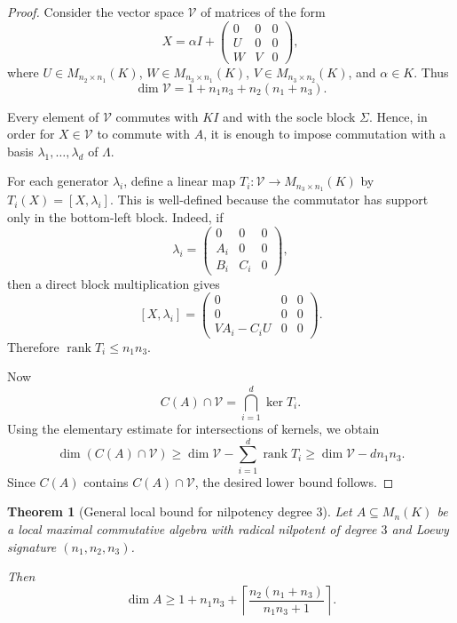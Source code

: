 \documentclass[11pt]{article}
\theoremstyle{remark}
\theoremstyle{plain}
\newtheorem{theorem}{Theorem}
\theoremstyle{definition}
\theoremstyle{myremark}
\begin{document}
\begin{proof}
	Consider the vector space \(\mathcal V\) of matrices of the form
	\[
	X=\alpha I+
	\begin{pmatrix}
		0&0&0\\
		U&0&0\\
		W&V&0
	\end{pmatrix},
	\]
	where \(U\in M_{n_2\times n_1}(K)\), \(W\in M_{n_3\times n_1}(K)\),
	\(V\in M_{n_3\times n_2}(K)\), and \(\alpha\in K\). Thus
	\[
	\dim \mathcal V=1+n_1n_3+n_2(n_1+n_3).
	\]
	
	Every element of \(\mathcal V\) commutes with \(KI\) and with the socle block
	\(\Sigma\). Hence, in order for \(X\in \mathcal V\) to commute with \(A\), it is enough
	to impose commutation with a basis
	\(\lambda_1,\dots,\lambda_d\) of \(\Lambda\).
	
	For each generator \(\lambda_i\), define a linear map
	\(T_i:\mathcal V\to M_{n_3\times n_1}(K)\) by \(T_i(X)=[X,\lambda_i]\). This is
	well-defined because the commutator has support only in the bottom-left block.
	Indeed, if
	\[
	\lambda_i=
	\begin{pmatrix}
		0&0&0\\
		A_i&0&0\\
		B_i&C_i&0
	\end{pmatrix},
	\]
	then a direct block multiplication gives
	\[
	[X,\lambda_i]=
	\begin{pmatrix}
		0&0&0\\
		0&0&0\\
		VA_i-C_iU&0&0
	\end{pmatrix}.
	\]
	Therefore \(\operatorname{rank}T_i\le n_1n_3\).
	
	Now
	\[
	C(A)\cap \mathcal V=\bigcap_{i=1}^d \ker T_i.
	\]
	Using the elementary estimate for intersections of kernels, we obtain
	\[
	\dim(C(A)\cap \mathcal V)
	\ge \dim\mathcal  V-\sum_{i=1}^d \operatorname{rank}T_i
	\ge \dim \mathcal V-dn_1n_3.
	\]
	Since \(C(A)\) contains \(C(A)\cap \mathcal V\), the desired lower bound follows.
\end{proof}\medskip


\begin{theorem}[General local bound for nilpotency degree \(3\)]
	Let \(A\subseteq M_n(K)\) be a local maximal commutative algebra with
	radical nilpotent of degree \(3\) and Loewy signature
	\((n_1,n_2,n_3)\).
	
	Then
	\begin{equation}\label{general3}
		\dim A\ge 1+n_1n_3+	\left\lceil	\frac{n_2(n_1+n_3)}{n_1n_3+1}\right\rceil.
	\end{equation}
\end{theorem}
\end{document}

